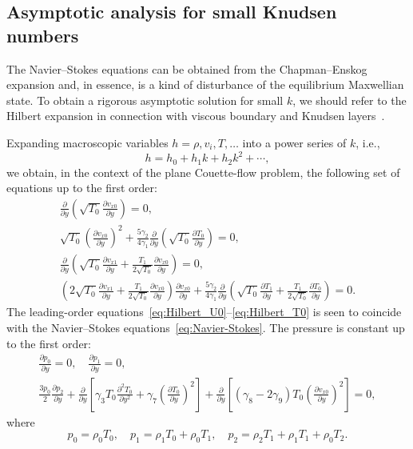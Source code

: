 \documentclass[aip,pof,preprint]{revtex4-1}
\newcommand{\pder}[2][]{\frac{\partial#1}{\partial#2}}
\newcommand{\pderdual}[2][]{\frac{\partial^2#1}{\partial#2^2}}
\begin{document}
\subsection{Asymptotic analysis for small Knudsen numbers}

The Navier--Stokes equations can be obtained from the Chapman--Enskog expansion
and, in essence, is a kind of disturbance of the equilibrium Maxwellian state.
To obtain a rigorous asymptotic solution for small \(k\),
we should refer to the Hilbert expansion in connection with
viscous boundary and Knudsen layers~\cite{Sone2000, Sone2002}.

Expanding macroscopic variables \(h = \rho, v_i, T, \dots\) into a power series of \(k\), i.e.,
\begin{equation}\label{eq:hilbert_expansion}
    h = h_0 + h_1k + h_2k^2 + \cdots,
\end{equation}
we obtain, in the context of the plane Couette-flow problem, the following set of equations up to the first order:
\begin{gather}
    \pder{y}\left( \sqrt{T_0}\pder[v_{x0}]{y} \right) = 0, \label{eq:Hilbert_U0}\\
    \sqrt{T_0}\left( \pder[v_{x0}]{y}\right)^2 + \frac{5\gamma_2}{4\gamma_1}\pder{y}\left(\sqrt{T_0}\pder[T_0]{y} \right) = 0, \label{eq:Hilbert_T0}\\
    \pder{y}\left( \sqrt{T_0}\pder[v_{x1}]{y} + \frac{T_1}{2\sqrt{T_0}}\pder[v_{x0}]{y} \right) = 0, \label{eq:Hilbert_U1}\\
    \left( 2\sqrt{T_0}\pder[v_{x1}]{y} + \frac{T_1}{2\sqrt{T_0}}\pder[v_{x0}]{y} \right) \pder[v_{x0}]{y}
        + \frac{5\gamma_2}{4\gamma_1} \pder{y}\left( \sqrt{T_0}\pder[T_1]{y} + \frac{T_1}{2\sqrt{T_0}}\pder[T_0]{y} \right) = 0. \label{eq:Hilbert_T1}
\end{gather}
The leading-order equations~\eqref{eq:Hilbert_U0}--\eqref{eq:Hilbert_T0}
is seen to coincide with the Navier--Stokes equations~\eqref{eq:Navier-Stokes}.
The pressure is constant up to the first order:
\begin{gather}
    \pder[p_0]{y} = 0, \quad \pder[p_1]{y} = 0, \label{eq:hilbert_p0_p1} \\
    \frac{3p_0}{2}\pder[p_2]{y}
        + \pder{y}\left[ \gamma_3 T_0 \pderdual[T_0]{y} + \gamma_7\left(\pder[T_0]{y}\right)^2 \right]
        + \pder{y}\left[ (\gamma_8-2\gamma_9)T_0\left(\pder[v_{x0}]{y}\right)^2 \right] = 0, \label{eq:hilbert_p2}
\end{gather}
where
\begin{equation}\label{eq:hilbert_expansion_p}
    p_0 = \rho_0 T_0, \quad
    p_1 = \rho_1 T_0 + \rho_0 T_1, \quad
    p_2 = \rho_2 T_1 + \rho_1 T_1 + \rho_0 T_2.
\end{equation}
\end{document}
